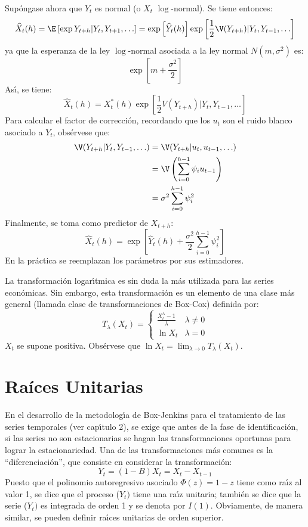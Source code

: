 Sup\'{o}ngase ahora que $Y_{t}$ es normal (o $X_{t}$ $\log$-normal). Se tiene entonces:
\[
\widehat{X} _{t} (h)=\E\left[ \exp Y_{t+h} | Y_{t} ,Y_{t+1} ,\ldots \right]
=\exp \left[\widehat{Y}_{t} (h) \right]\exp \left[ \frac{1}{2}\V(Y_{t+h} )| Y_{t},Y_{t-1} ,\ldots \right]
\]
ya que la esperanza de la ley $\log$-normal asociada a la ley normal $N(m, 
\sigma^{2})$ es:
\[
\exp \left[ {m+\frac{\sigma^{2}}{2}} \right]
\]
As\'{\i}, se tiene:
\[
\widehat{X} _{t} (h)=X_{t}^{\ast } (h)\exp \left[ 
{\frac{1}{2}V(Y_{t+h} )| Y_{t} ,Y_{t-1} ,\ldots} \right]
\]
Para calcular el factor de correcci\'{o}n, recordando que los 
$u_{t}$ son el ruido blanco asociado a $Y_{t}$, 
obs\'{e}rvese que:
\begin{align*}
\V(Y_{t+h} | Y_{t} ,Y_{t-1} ,\ldots)
	&=\V(Y_{t+h}| u_{t},u_{t-1} ,\ldots) \\ 
	&=\V\left(\sum_{i=0}^{h-1} \psi_{i} u_{t-1} \right) \\ 
	&=\sigma^{2}\sum_{i=0}^{h-1} {\psi_{i}^{2} }
\end{align*}
Finalmente, se toma como predictor de $X_{{t+h}}$:
\[
\widehat{X} _{t} (h)=\exp \left[ {\widehat{Y}_{t} (h)+\frac{\sigma^{2}}{2}\sum_{i=0}^{h-1} {\psi _{i}^{2} } } \right]
\]
En la pr\'{a}ctica se reemplazan los par\'{a}metros por sus estimadores.

La transformaci\'{o}n logar\'{\i}tmica es sin duda la m\'{a}s utilizada para 
las series econ\'{o}micas. Sin embargo, esta transformaci\'{o}n es un 
elemento de una clase m\'{a}s general (llamada clase de transformaciones de 
Box-Cox) definida por:
\[
T_{\lambda } (X_{t} )=\begin{cases}
                       \displaystyle\frac{X_{t}^{\lambda } -1}{\lambda }&\lambda \ne 0\\[1mm]
                       \ln X_{t} & \lambda =0
                      \end{cases}
\]
$X_{t}$ se supone positiva. Obs\'{e}rvese que $\ln X_{t}=\lim_{\lambda \to 0} T_{\lambda } (X_{t} )$.



\section{Ra\'{i}ces Unitarias}

En el desarrollo de la metodolog\'{\i}a de Box-Jenkins para el tratamiento 
de las series temporales (ver cap\'{\i}tulo 2), se exige que antes de la 
fase de identificaci\'{o}n, si las series no son estacionarias se hagan las 
transformaciones oportunas para lograr la estacionariedad. Una de las 
transformaciones m\'{a}s comunes es la 
``diferenciaci\'{o}n'', que consiste en considerar 
la transformaci\'{o}n:
\[
Y_{t}=\left( 1-B \right)X_{t}=X_{t}-X_{t-1}
\]
Puesto que el polinomio autoregresivo asociado ${\Phi }\left( z 
\right)=1-z$ tiene como ra\'{\i}z al valor 1, se dice que el proceso 
($Y_{t})$ tiene una ra\'{\i}z unitaria; 
tambi\'{e}n se dice que la serie ($Y_{t})$ es integrada de orden 1 y se 
denota por $I(1)$. Obviamente, de manera similar, se pueden definir 
ra\'{\i}ces unitarias de orden superior.

